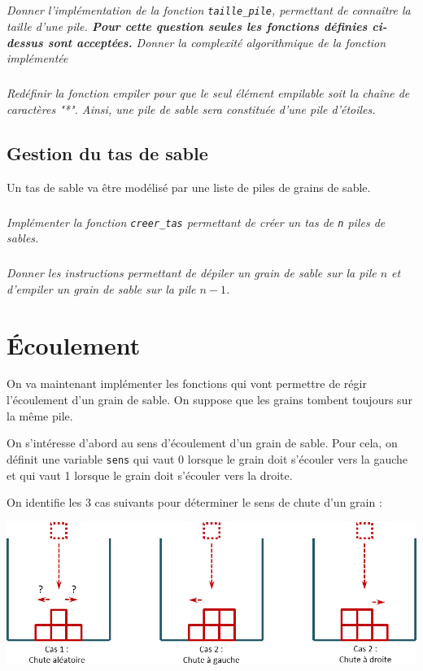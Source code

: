 \documentclass[10pt,fleqn]{article} %
\begin{document}
\subparagraph{}
\textit{Donner l'implémentation de la fonction \texttt{taille\_pile}, permettant de connaître la taille d'une pile. \textbf{Pour cette question seules les fonctions définies ci-dessus sont acceptées.} Donner la complexité algorithmique de la fonction implémentée}


\subparagraph{}
\textit{Redéfinir la fonction empiler pour que le seul élément empilable soit la chaîne de caractères "*". Ainsi, une pile de sable sera constituée d'une pile d'étoiles. }


\subsection{Gestion du tas de sable}
Un tas de sable va être modélisé par une liste de piles de grains de sable. 

\subparagraph{}\textit{Implémenter la fonction \texttt{creer\_tas} permettant de créer un tas de \texttt{n} piles de sables.}

\subparagraph{}\textit{Donner les instructions permettant de dépiler un grain de sable sur la pile $n$ et d'empiler un grain de sable sur la pile $n-1$.}

\section{Écoulement}
On va maintenant implémenter les fonctions qui vont permettre de régir l'écoulement d'un grain de sable. On suppose que les grains tombent toujours sur la même pile. 

On s'intéresse d'abord au sens d'écoulement d'un grain de sable. Pour cela, on définit une variable \texttt{sens} qui vaut 0 lorsque le grain doit s'écouler vers la gauche et qui vaut 1 lorsque le grain doit s'écouler vers la droite. 

On identifie les 3 cas suivants pour déterminer le sens de chute d'un grain :
\begin{center}
\includegraphics[width=\linewidth]{images/sablier_03}
\end{center}
\end{document}
